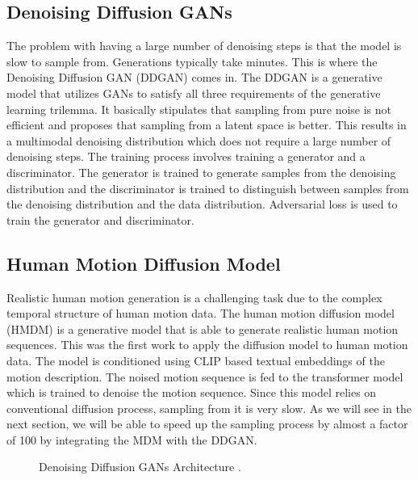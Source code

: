 \documentclass[10pt,twocolumn,letterpaper]{article}
\begin{document}
\subsection{Denoising Diffusion GANs}
The problem with having a large number of denoising steps is that the model is slow to sample from. Generations typically 
take minutes. This is where the Denoising Diffusion GAN (DDGAN) \cite{Xiao22} comes in. The DDGAN is a generative model that
utilizes GANs to satisfy all three requirements of the generative learning trilemma. It basically 
stipulates that sampling from pure noise is not efficient and proposes that sampling from a latent space is better.
This results in a multimodal denoising distribution which does not require a large number of denoising steps.
The training process involves training a generator and a discriminator. The generator is trained to generate samples from the
denoising distribution and the discriminator is trained to distinguish between samples from the denoising distribution and the
data distribution. Adversarial loss is used to train the generator and discriminator.

\subsection{Human Motion Diffusion Model}
Realistic human motion generation is a challenging task due to the complex temporal structure of human motion data.
The human motion diffusion model (HMDM) \cite{Tevet23} is a generative model that is able to generate realistic human motion sequences.
This was the first work to apply the diffusion model to human motion data. The model is conditioned using CLIP \cite{radford2021learning}
based textual embeddings of the motion description. The noised motion sequence is fed to the transformer model which
is trained to denoise the motion sequence. Since this model relies on conventional diffusion process,
sampling from it is very slow. As we will see in the next section, we will be able to speed up the sampling process
by almost a factor of 100 by integrating the MDM with the DDGAN.


\begin{figure}[H]
    \centering

    \caption{Denoising Diffusion GANs Architecture \cite{Xiao22}.}
    \label{fig:intro-1}
\end{figure}
\end{document}
